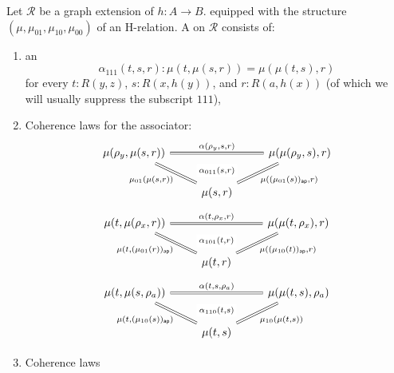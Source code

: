\begin{defn}
Let $\mathcal{R}$ be a graph extension of $h:A\to B$. equipped with the structure $(\mu,\mu_{01},\mu_{10},\mu_{00})$ of an H-relation. A  on $\mathcal{R}$ consists of:
\begin{enumerate}
\item an 
\begin{equation*}
\alpha_{111}(t,s,r) : \mu(t,\mu(s,r))=\mu(\mu(t,s),r)
\end{equation*}
for every $t:R(y,z)$, $s:R(x,h(y))$, and $r:R(a,h(x))$ (of which we will usually suppress the subscript $111$),
\item Coherence laws for the associator:
\begin{equation*}
\begin{tikzcd}
\mu(\rho_y,\mu(s,r)) \arrow[rr,equals,"{\alpha(\rho_y,s,r)}",""{name=A,below}] \arrow[dr,equals,swap,"{\mu_{01}(\mu(s,r))}"] & & \mu(\mu(\rho_y,s),r) \arrow[dl,equals,"{\mu((\mu_{01}(s))_{\mathsf{ap}},r)}"] \\
\phantom{\mu(\mu(\rho_y,s),r)} & \mu(s,r) \arrow[to=A,draw=none,"{\alpha_{011}(s,r)}" description] & \phantom{\mu(\rho_y,\mu(s,r))}
\end{tikzcd}
\end{equation*}
\begin{equation*}
\begin{tikzcd}
\mu(t,\mu(\rho_x,r)) \arrow[rr,equals,"{\alpha(t,\rho_x,r)}",""{name=A,below}] \arrow[dr,equals,swap,"{\mu(t,(\mu_{01}(r))_{\mathsf{ap}})}"] & & \mu(\mu(t,\rho_x),r) \arrow[dl,equals,"{\mu((\mu_{10}(t))_{\mathsf{ap}},r)}"] \\
& \mu(t,r) \arrow[to=A,draw=none,"{\alpha_{101}(t,r)}" description]
\end{tikzcd}
\end{equation*}
\begin{equation*}
\begin{tikzcd}
\mu(t,\mu(s,\rho_a)) \arrow[rr,equals,"{\alpha(t,s,\rho_a)}",""{name=A,below}] \arrow[dr,equals,swap,"{\mu(t,(\mu_{10}(s))_{\mathsf{ap}})}"] & & \mu(\mu(t,s),\rho_a) \arrow[dl,equals,"{\mu_{10}(\mu(t,s))}"] \\
& \mu(t,s) \arrow[to=A,draw=none,"{\alpha_{110}(t,s)}" description]
\end{tikzcd}
\end{equation*}
\item Coherence laws
\begin{equation*}
\begin{tikzcd}

\end{tikzcd}
\end{equation*}
\end{enumerate}
\end{defn}
